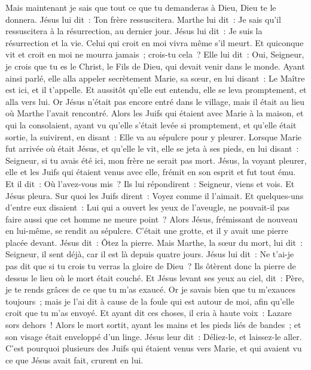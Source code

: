 \begin{multicols}{2}
Mais maintenant je sais que tout ce que tu demanderas à Dieu, Dieu te le donnera.
Jésus lui dit~: Ton frère ressuscitera.
Marthe lui dit~: Je sais qu'il ressuscitera à la résurrection, au dernier jour.
Jésus lui dit~: Je suis la résurrection et la vie. Celui qui croit en moi vivra même s'il meurt.
Et quiconque vit et croit en moi ne mourra jamais~; crois-tu cela~?
Elle lui dit~: Oui, Seigneur, je crois que tu es le Christ, le Fils de Dieu, qui devait venir dans le monde.
Ayant ainsi parlé, elle alla appeler secrètement Marie, sa sœur, en lui disant~: Le Maître est ici, et il t'appelle.
Et aussitôt qu'elle eut entendu, elle se leva promptement, et alla vers lui.
Or Jésus n'était pas encore entré dans le village, mais il était au lieu où Marthe l'avait rencontré.
Alors les Juifs qui étaient avec Marie à la maison, et qui la consolaient, ayant vu qu'elle s'était levée si promptement, et qu'elle était sortie, la suivirent, en disant~: Elle va au sépulcre pour y pleurer.
Lorsque Marie fut arrivée où était Jésus, et qu'elle le vit, elle se jeta à ses pieds, en lui disant~: Seigneur, si tu avais été ici, mon frère ne serait pas mort.
Jésus, la voyant pleurer, elle et les Juifs qui étaient venus avec elle, frémit en son esprit et fut tout ému.
Et il dit~: Où l'avez-vous mis~? Ils lui répondirent~: Seigneur, viens et vois.
Et Jésus pleura.
Sur quoi les Juifs dirent~: Voyez comme il l'aimait.
Et quelques-uns d'entre eux disaient~: Lui qui a ouvert les yeux de l'aveugle, ne pouvait-il pas faire aussi que cet homme ne meure point~?
Alors Jésus, frémissant de nouveau en lui-même, se rendit au sépulcre. C'était une grotte, et il y avait une pierre placée devant.
Jésus dit~: Ôtez la pierre. Mais Marthe, la sœur du mort, lui dit~: Seigneur, il sent déjà, car il est là depuis quatre jours.
Jésus lui dit~: Ne t'ai-je pas dit que si tu crois tu verras la gloire de Dieu~?
Ils ôtèrent donc la pierre de dessus le lieu où le mort était couché. Et Jésus levant ses yeux au ciel, dit~: Père, je te rends grâces de ce que tu m'as exaucé.
Or je savais bien que tu m'exauces toujours~; mais je l'ai dit à cause de la foule qui est autour de moi, afin qu'elle croit que tu m'as envoyé.
Et ayant dit ces choses, il cria à haute voix~: Lazare sors dehors~!
Alors le mort sortit, ayant les mains et les pieds liés de bandes~; et son visage était enveloppé d'un linge. Jésus leur dit~: Déliez-le, et laissez-le aller.
C'est pourquoi plusieurs des Juifs qui étaient venus vers Marie, et qui avaient vu ce que Jésus avait fait, crurent en lui.

\end{multicols}
